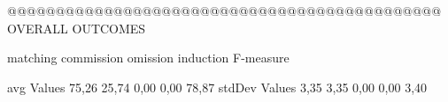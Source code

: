 @@@@@@@@@@@@@@@@@@@@@@@@@@@@@@@@@@@@@@@@@@@@@ OVERALL OUTCOMES

               matching commission   omission  induction  F-measure
               
avg Values      75,26       25,74       0,00      0,00     78,87        
stdDev Values    3,35       3,35       0,00       0,00     3,40        